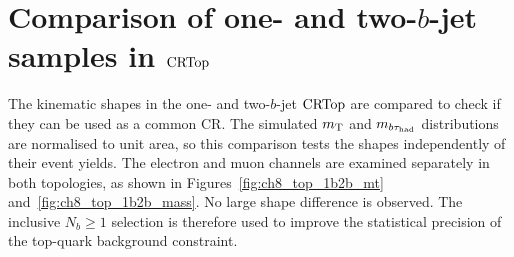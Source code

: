 \chapter[Comparison of one- and two-\texorpdfstring{$b$}{b}-jet samples in CRTop]{Comparison of one- and two-$b$-jet samples in $\mathrm{CRTop}$}
\label{app:ch8_topcr_1b2b}

The kinematic shapes in the one- and two-$b$-jet $\mathrm{CRTop}$ are compared to check if they can be used as a common CR.
The simulated $m_{\mathrm{T}}$ and $m_{b\tau_{\mathrm{had}}}$ distributions are normalised to unit area, so this comparison tests the shapes independently of their event yields.
The electron and muon channels are examined separately in both topologies, as shown in Figures~\ref{fig:ch8_top_1b2b_mt} and~\ref{fig:ch8_top_1b2b_mass}.
No large shape difference is observed.
The inclusive $N_b\geq1$ selection is therefore used to improve the statistical precision of the top-quark background constraint.


